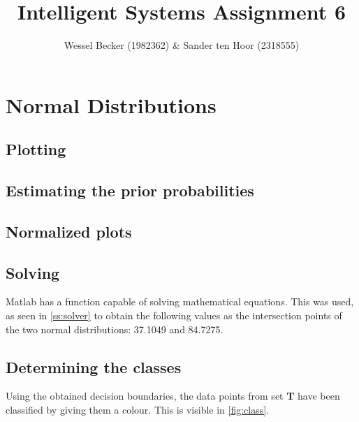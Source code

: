 \documentclass[10pt,a4paper]{article}
\begin{document}
\title{Intelligent Systems Assignment 6}
\author{Wessel Becker (1982362) \& Sander ten Hoor (2318555)}
\maketitle

\newcommand{\simplesubfigure}[3]{
  \noindent\begin{minipage}{.31\linewidth}
    \begin{center}
      \texttt{[image: \#1]}
      \captionof{figure}{#2}
      \label{#3}
    \end{center}
  \end{minipage}\hspace{7pt}
}
\newcommand{\simplefigure}[3]{
	\noindent\begin{figure}[H]
  	\centering
    	\makebox[.6\textwidth]
    	{
    		\texttt{[image: \#1]}
 		} \\
  		\caption{#2}
  		\label{#3}
	\end{figure}
}
\newcommand{\mcode}[2]{
	\label{#2}
}

\section{Normal Distributions}
\subsection{Plotting}
\subsection{Estimating the prior probabilities}
\subsection{Normalized plots}
\subsection{Solving}\label{ss:solving}
Matlab has a function capable of solving mathematical equations. This was used, as seen in \autoref{ss:solver} to obtain the following values as the intersection points of the two normal distributions: 37.1049 and 84.7275.
\subsection{Determining the classes}
Using the obtained decision boundaries, the data points from set \textbf{T} have been classified by giving them a colour. This is visible in \autoref{fig:class}.
\end{document}
